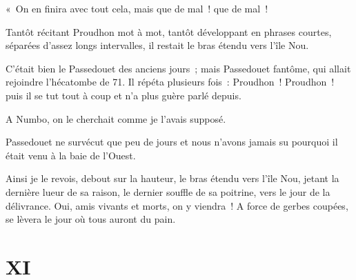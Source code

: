 \documentclass[french,twoside]{book} %
\newcommand\chapteropen{} %
\newcommand\chapterclose{} %
\begin{document}
« On en finira avec tout cela, mais que de mal ! que de mal !\par
Tantôt récitant Proudhon mot à mot, tantôt développant en phrases courtes, séparées d’assez longs intervalles, il restait le bras étendu vers l’île Nou.\par
C’était bien le Passedouet des anciens jours ; mais Passedouet fantôme, qui allait rejoindre l’hécatombe de 71. Il répéta plusieurs fois :  Proudhon ! Proudhon ! puis il se tut tout à coup et n’a plus guère parlé depuis.\par
A Numbo, on le cherchait comme je l’avais supposé.\par
Passedouet ne survécut que peu de jours et nous n’avons jamais su pourquoi il était venu à la baie de l’Ouest.\par
Ainsi je le revois, debout sur la hauteur, le bras étendu vers l’île Nou, jetant la dernière lueur de sa raison, le dernier souffle de sa poitrine, vers le jour de la délivrance. Oui, amis vivants et morts, on y viendra ! A force de gerbes coupées, se lèvera le jour où tous auront du pain.
\chapterclose


\chapteropen
 \chapter[{XI}]{XI}
\label{p1.11}
\end{document}
